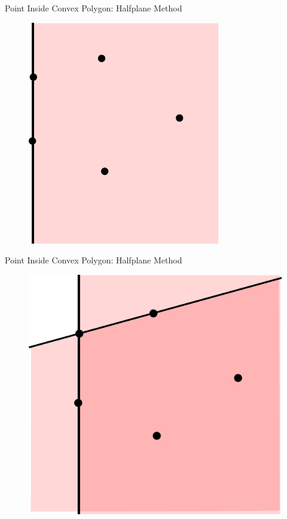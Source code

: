 \documentclass{beamer}
\begin{document}
\begin{frame}{Point Inside Convex Polygon: Halfplane Method}

\begin{figure}[t]
	\centering
	\includegraphics[width=0.75\textwidth]{Halfplane1.pdf}
\end{figure}

\end{frame}

\begin{frame}{Point Inside Convex Polygon: Halfplane Method}

\begin{figure}[t]
	\centering
	\includegraphics[width=\textwidth]{Halfplane2.pdf}
\end{figure}

\end{frame}
\end{document}
